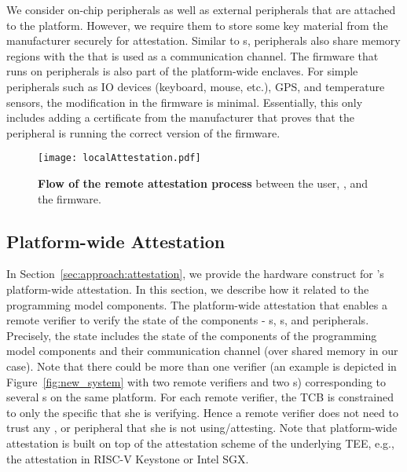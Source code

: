 We consider on-chip peripherals as well as external peripherals that are attached to the platform. However, we require them to store some key material from the manufacturer securely for attestation. Similar to \app{}s, peripherals also share memory regions with the \ce that is used as a communication channel. The firmware that runs on peripherals is also part of the platform-wide enclaves. For simple peripherals such as IO devices (keyboard, mouse, etc.), GPS, and temperature sensors, the modification in the firmware is minimal. Essentially, this only includes adding a certificate from the manufacturer that proves that the peripheral is running the correct version of the firmware. %

\begin{figure}[t]
  \centering
  \texttt{[image: localAttestation.pdf]}
  \caption{\textbf{Flow of the remote attestation process} between the user, \ce, \app and the firmware.} \vspace{-1.5em}
  \label{fig:attestationFlow}
\end{figure}

\subsection{Platform-wide Attestation}
\label{sec:programmingModel:attestation}

In Section~\ref{sec:approach:attestation}, we provide the hardware construct for \name{}'s platform-wide attestation. In this section, we describe how it related to the programming model components. The platform-wide attestation that enables a remote verifier to verify the state of the \nameenclave components - \app{}s, \ce{}s, and peripherals. Precisely, the state includes the state of the components of the programming model components and their communication channel (over shared memory in our case). Note that there could be more than one verifier (an example is depicted in Figure~\ref{fig:new_system} with two remote verifiers and two \nameenclave{}s) corresponding to several \nameenclave{}s on the same platform. For each remote verifier, the TCB is constrained to only the specific \nameenclave that she is verifying. Hence a remote verifier does not need to trust any \app, \ce or peripheral that she is not using/attesting. Note that platform-wide attestation is built on top of the attestation scheme of the underlying TEE, e.g., the attestation in RISC-V Keystone or Intel SGX. %

